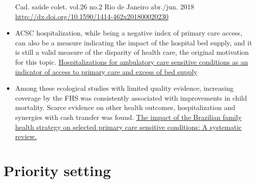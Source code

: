 \documentclass[]{book}
\begin{document}
\begin{itemize}
  Cad. saúde colet. vol.26 no.2 Rio de Janeiro abr./jun. 2018 \url{http://dx.doi.org/10.1590/1414-462x201800020230}
\item
  ACSC hospitalization, while being a negative index of primary care access, can also be a measure indicating the impact of the hospital bed supply, and it is still a valid measure of the disparity of health care, the original motivation for this topic. \href{https://bmchealthservres.biomedcentral.com/articles/10.1186/s12913-019-4098-x}{Hospitalizations for ambulatory care sensitive conditions as an indicator of access to primary care and excess of bed supply}
\item
  Among these ecological studies with limited quality evidence, increasing coverage by the FHS was consistently associated with improvements in child mortality. Scarce evidence on other health outcomes, hospitalization and synergies with cash transfer was found. \href{https://journals.plos.org/plosone/article?id=10.1371/journal.pone.0182336}{The impact of the Brazilian family health strategy on selected primary care sensitive conditions: A systematic review.}
\end{itemize}

\hypertarget{priority-setting}{%
\section*{Priority setting}\label{priority-setting}}
\end{document}
